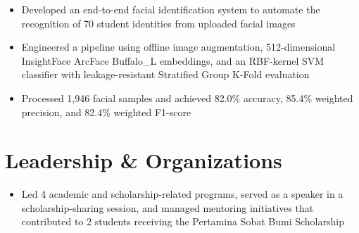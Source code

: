 
\vspace{-0.3em}
\begin{itemize}
  \item Developed an end-to-end facial identification system to automate the recognition of 70 student identities from uploaded facial images
  \item Engineered a pipeline using offline image augmentation, 512-dimensional InsightFace ArcFace Buffalo\_L embeddings, and an RBF-kernel SVM classifier with leakage-resistant Stratified Group K-Fold evaluation
  \item Processed 1,946 facial samples and achieved 82.0\% accuracy, 85.4\% weighted precision, and 82.4\% weighted F1-score
\end{itemize}

\section*{Leadership \& Organizations}
\vspace{-0.3em}
\begin{itemize}
  \item Led 4 academic and scholarship-related programs, served as a speaker in a scholarship-sharing session, and managed mentoring initiatives that contributed to 2 students receiving the Pertamina Sobat Bumi Scholarship
\end{itemize}


